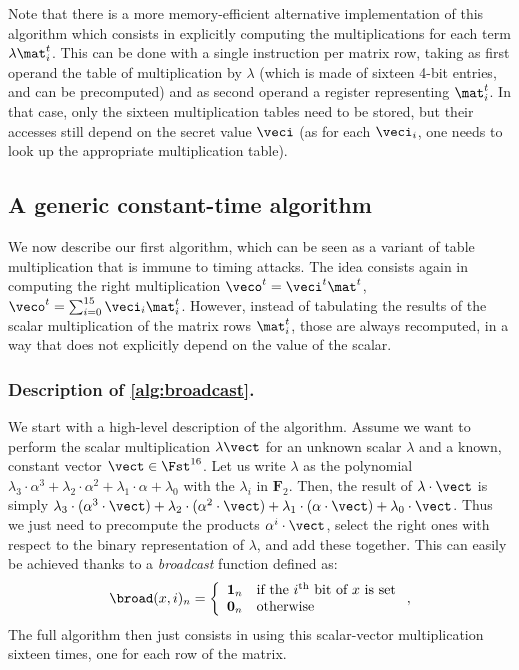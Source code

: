 Note that there is a more memory-efficient alternative implementation of this algorithm which consists in explicitly computing the multiplications for each term $\lambda\mat^t_i$.
This can be done with a single \pshufb instruction per matrix row, taking as first operand the table of multiplication by $\lambda$ (which is made of sixteen
4-bit entries, and can be precomputed) and as second operand a register representing $\mat^t_i$.
In that case, only the sixteen multiplication tables need to be stored, but their accesses
still depend on the secret value $\veci$ (as for each $\veci_i$, one needs to look up the appropriate multiplication table).


\subsection{A generic constant-time algorithm}
\label{bbased}
We now describe our first algorithm, which can be seen as a variant of table multiplication that is immune to timing attacks.
The idea consists again in computing the right multiplication $\veco^t = \veci^t\mat^t$, \ie{} $\veco^t = \sum_{i = 0}^{15} \veci_i\mat^t_i$. However, instead of tabulating
the results of the scalar multiplication of the matrix rows $\mat^t_i$, those are always recomputed, in a way that does not explicitly depend on the value of the scalar.

\subsubsection{Description of \autoref{alg:broadcast}.}
We start with a high-level description of the algorithm.
Assume we want to perform the scalar multiplication $\lambda\vect$ for an unknown scalar $\lambda$ and a known, constant vector $\vect \in \Fst^{16}$.
Let us write $\lambda$ as the polynomial
$\lambda_3\cdot \alpha^3 + \lambda_2\cdot \alpha^2 + \lambda_1\cdot \alpha + \lambda_0$ with the $\lambda_i$ in $\mathbf{F}_2$.
Then, the result of $\lambda\cdot\vect$ is simply $\lambda_3\cdot(\alpha^3\cdot\vect) + \lambda_2\cdot(\alpha^2\cdot\vect) + \lambda_1\cdot(\alpha\cdot\vect) + \lambda_0\cdot\vect$.
Thus we just need to precompute the products $\alpha^i\cdot\vect$, select the right ones with respect to the binary representation
of $\lambda$, and add these together.
This can easily be achieved thanks to a \emph{broadcast} function defined as:
\[
\broad(x,i)_n = \left\{
				\begin{array}{ll}
				\mathbf{1}_n  & \text{if the $i^\text{th}$ bit of $x$ is set}\\
				\mathbf{0}_n & \text{otherwise}
				\end{array}
	    \right.,
\]
The full algorithm then just consists in using this
scalar-vector multiplication sixteen times, one for each row of the matrix.

